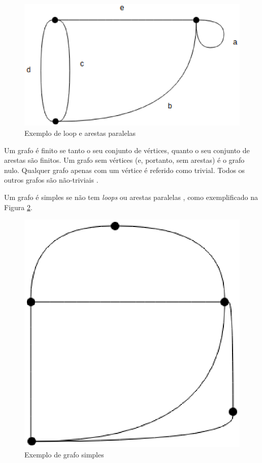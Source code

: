 \begin{figure}[!h]
	\centering
	\includegraphics[scale=0.5]{figuras/capitulo2/loop_paralela.eps}
	\caption{Exemplo de loop e arestas paralelas}
	\label{loop_paralela}
\end{figure}

Um grafo é finito se tanto o seu conjunto de vértices, quanto o seu conjunto de arestas são finitos. Um grafo sem vértices (e, portanto, sem arestas) é o grafo nulo. Qualquer grafo apenas com um vértice é referido como trivial. Todos os outros grafos são não-triviais \cite{Costa:2011}.

Um grafo é simples se não tem \textit{loops} ou arestas paralelas \cite{Diestel:1997}, como exemplificado na Figura \ref{grafo_simples}.

\begin{figure}[!h]
	\centering
	\includegraphics[scale=0.5]{figuras/capitulo2/grafo_simples.eps}
	\caption{Exemplo de grafo simples}
	\label{grafo_simples}
\end{figure}

